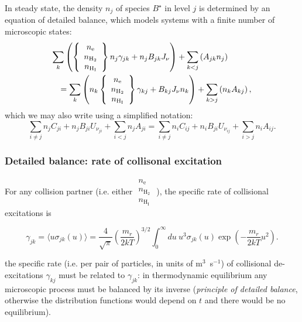 \begin{frame}
In steady state, the density $n_j$ of species $B^\star$ in level $j$
is determined by an equation of detailed balance, which models systems
with a finite number of microscopic states:
\begin{eqnarray*}
\lefteqn{\sum_k    \left(    \left\{ \begin{array}{c}  n_\mathrm{e} \\
    n_\mathrm{H_2} \\  n_\mathrm{H_I} \end{array} \right\}    n_j
  \gamma_{jk} +  {n}_{j} B_{jk} J_\nu \right) + \sum_{k<j} \left( A_{jk} n_j  \right)   } \\   
& &     =    \sum_k \left(  n_k      \left\{ \begin{array}{c}  n_\mathrm{e} \\  n_\mathrm{H_2} \\  n_\mathrm{H_I} \end{array} \right\}  \gamma_{kj} + B_{kj} J_\nu n_k \right) + \sum_{k>j} \left( n_k A_{kj} \right),
\end{eqnarray*}
which we may also write using a  simplified notation: 
\[\sum_{i{\neq}j}
{n}_{j}{C}_{ji} + {n}_{j}{B}_{ji} U_{\nu_{ji}} +
\sum_{i<j}{n}_{j}{A}_{ji} = \sum_{i{\neq}j}{n}_{i}{C}_{ij} +  {n}_{i}{B}_{ji} U_{\nu_{ij}} + \sum_{i>j}{n}_{i}{A}_{ij}. 
\]

\vfill



\end{frame} \begin{frame}\frametitle{Detailed balance: rate of collisonal excitation}

For any collision partner (i.e. either $\begin{array}{c}  n_\mathrm{e}
\\  n_\mathrm{H_2} \\  n_\mathrm{H_I} \end{array} $ ), the specific rate of
collisional excitations is

\[
\gamma_{jk} = \langle u \sigma_{jk}(u) \rangle = \frac{4}{\sqrt{\pi}} \left(\frac{m_r}{2kT} \right)^{3/2} \int_0^\infty du ~ u^3 \sigma_{jk}(u) \exp\left(  - \frac{m_r}{2kT} u^2 \right).
\]

 the specific rate (i.e. per pair of  particles, in units of
m$^{3}$~s$^{-1}$) of collisional de-excitations $\gamma_{kj}$ must be
related to $\gamma_{jk}$: in thermodynamic equilibrium any microscopic
process must be balanced by its inverse ({\em principle of detailed
balance}, otherwise the distribution functions would depend on $t$ and
there would be no equilibrium).


\end{frame}
